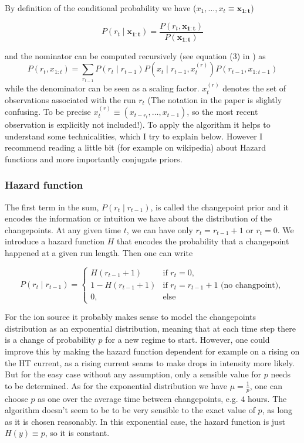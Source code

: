 \documentclass[12pt,a4paper]{article}
\begin{document}
By definition of the conditional probability we have ($x_1,\dots,x_t \equiv \bm{{ x_{1:t}}}$)

\begin{equation*}
	P(r_t \mid \bm{{x_{1:t}}}) = \frac{P(r_t, \bm{{ x_{1:t}}})}{P(\bm{{x_{1:t}}})}
\end{equation*}

and the nominator can be computed recursively (see equation (3) in \cite{Adams:BayesianOnlineChangepoint}) as
\begin{equation}\label{eq:prob_rt_and_x1t}
	P(r_t, x_{1:t}) = \sum_{r_{t-1}} P(r_t \mid r_{t-1}) P(x_t \mid r_{t-1}, x_t^{(r)}) P(r_{t-1}, x_{1:t-1})
\end{equation}
while the denominator can be seen as a scaling factor. $x_t^{(r)}$ denotes the set of observations associated with the run $r_t$ (The notation in the paper is slightly confusing. To be precise $x_t^{(r)} \equiv (x_{t-r_t}, \dots, x_{t-1})$, so the most recent observation is explicitly not included!). To apply the algorithm it helps to understand some technicalities, which I try to explain below. However I recommend reading a little bit (for example on wikipedia) about Hazard functions and more importantly conjugate priors.

\subsubsection{Hazard function}
The first term in the sum, $P(r_t \mid r_{t-1})$,  is called the changepoint prior and it encodes the information or intuition we have about the distribution of the changepoints. At any given time $t$, we can have only $r_t=r_{t-1} + 1$ or $r_t=0$. We introduce a hazard function $H$ that encodes the probability that a changepoint happened at a given run length. Then one can write

\begin{equation*}
	P(r_t \mid r_{t-1}) = \begin{cases}
		H(r_{t-1} + 1) &\text{if } r_t=0, \\
		1 - H(r_{t-1} + 1) &\text{if } r_t=r_{t-1} + 1 \text{ (no changpoint)},  \\
		0, & \text{else} 
	\end{cases}
\end{equation*}

For the ion source it probably makes sense to model the changepoints distribution as an exponential distribution, meaning that at each time step there is a change of probability $p$ for a new regime to start. However, one could improve this by making the hazard function dependent for example on a rising on the HT current, as a rising current seams to make drops in intensity more likely. But for the easy case without any assumption, only a sensible value for $p$ needs to be determined. As for the exponential distribution we have $\mu=\frac1p$, one can choose $p$ as one over the average time between changepoints, e.g. $4$ hours. The algorithm doesn't seem to be to be very sensible to the exact value of $p$, as long as it is chosen reasonably. In this exponential case, the hazard function is just $H(y)\equiv p$, so it is constant.
\end{document}
